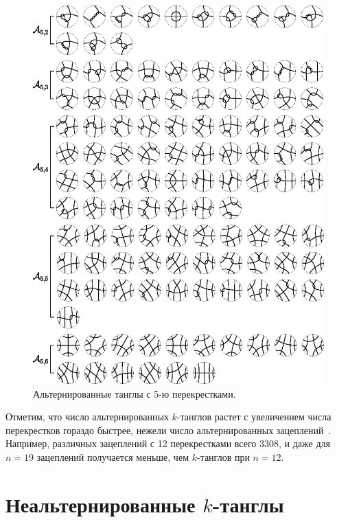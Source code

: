 \documentclass[12pt]{article}
\theoremstyle{plain}
\theoremstyle{definition}
\begin{document}
		\begin{figure}[ht]
			\centering
			\includegraphics[scale=0.8]{c/alternating-tangles-5.eps}
			\caption{\footnotesize Альтернированные танглы с 5-ю перекрестками.\label{figure:tangles5}}
		\end{figure}

		Отметим, что число альтернированных $k$-танглов растет с увеличением числа перекрестков гораздо быстрее, нежели число
		альтернированных зацеплений~\cite{RankinSchermannSmith2002_1, RankinSchermannSmith2002_2, RankinSmith2002}. Например, различных
		зацеплений с 12 перекрестками всего 3308, и даже для $n = 19$ зацеплений получается меньше, чем $k$-танглов при $n = 12$.

	\newpage
	\section{Неальтернированные $k$-танглы}\label{section:non-alternating}
\end{document}
